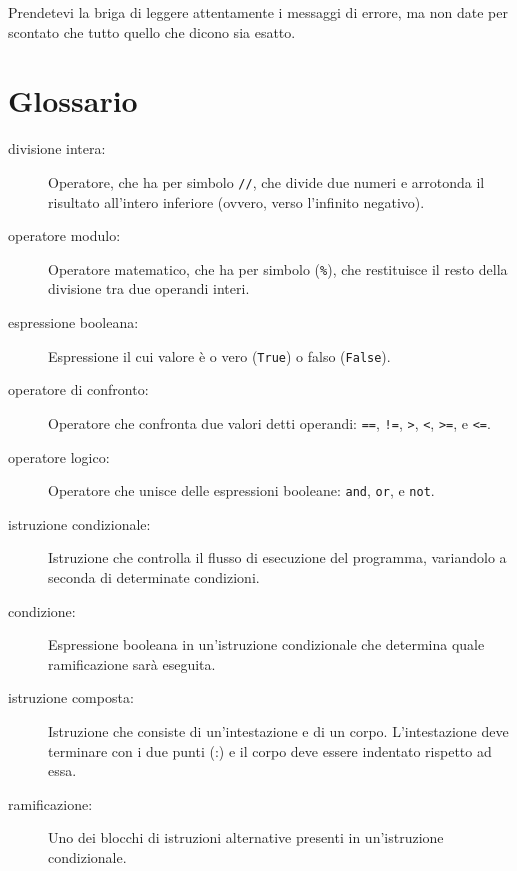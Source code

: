 \documentclass[10pt]{book}
\begin{document}
Prendetevi la briga di leggere attentamente i messaggi di errore, ma non date per scontato che tutto quello che dicono sia esatto.


\section{Glossario}

\begin{description}

\item[divisione intera:] Operatore, che ha per simbolo {\tt //}, che divide due numeri e arrotonda il risultato all'intero inferiore (ovvero, verso l'infinito negativo).
  
\item[operatore modulo:]  Operatore matematico, che ha per simbolo ({\tt \%}), che restituisce il resto della divisione tra due operandi interi.

\item[espressione booleana:]  Espressione il cui valore è o vero 
({\tt True}) o falso ({\tt False}).

\item[operatore di confronto:] Operatore che confronta due valori detti operandi: {\tt ==}, {\tt !=}, {\tt >}, {\tt <}, {\tt >=}, e {\tt <=}.

\item[operatore logico:] Operatore che unisce delle espressioni booleane: {\tt and}, {\tt or}, e {\tt not}.

\item[istruzione condizionale:]  Istruzione che controlla il flusso di esecuzione del programma, variandolo a seconda di determinate condizioni.

\item[condizione:] Espressione booleana in un'istruzione condizionale che determina quale ramificazione sarà eseguita.

\item[istruzione composta:]  Istruzione che consiste di un'intestazione e di un corpo. L'intestazione deve terminare con i due punti (:) e il corpo deve essere indentato rispetto ad essa.

\item[ramificazione:] Uno dei blocchi di istruzioni alternative presenti in un'istruzione condizionale.


\end{description}
\end{document}
